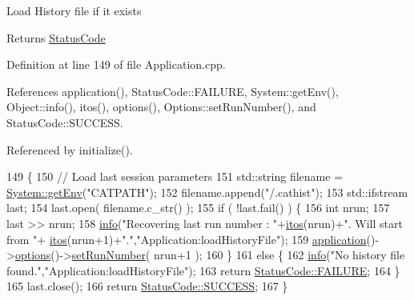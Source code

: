 Load History file if it exists \begin{DoxyReturn}{Returns}
\hyperlink{classStatusCode}{Status\+Code} 
\end{DoxyReturn}


Definition at line 149 of file Application.\+cpp.



References application(), Status\+Code\+::\+F\+A\+I\+L\+U\+RE, System\+::get\+Env(), Object\+::info(), itos(), options(), Options\+::set\+Run\+Number(), and Status\+Code\+::\+S\+U\+C\+C\+E\+SS.



Referenced by initialize().


\begin{DoxyCode}
149                                        \{
150   \textcolor{comment}{// Load last session parameters}
151   std::string filename = \hyperlink{namespaceSystem_af83af19ba6c1083e5643390dfd65f7aa}{System::getEnv}(\textcolor{stringliteral}{"CATPATH"});
152   filename.append(\textcolor{stringliteral}{"/.cathist"});
153   std::ifstream last;
154   last.open( filename.c\_str() );
155   \textcolor{keywordflow}{if} ( !last.fail() ) \{
156     \textcolor{keywordtype}{int} nrun;
157     last >> nrun;
158     \hyperlink{classObject_a644fd329ea4cb85f54fa6846484b84a8}{info}(\textcolor{stringliteral}{"Recovering last run number : "}+\hyperlink{Tools_8h_af330027dbdafb9a30768b3613c553e60}{itos}(nrun)+\textcolor{stringliteral}{". Will start from "}+
      \hyperlink{Tools_8h_af330027dbdafb9a30768b3613c553e60}{itos}(nrun+1)+\textcolor{stringliteral}{"."},\textcolor{stringliteral}{"Application:loadHistoryFile"});
159     \hyperlink{Tools_8h_a27885a3c35afe79029fb830f32f66458}{application}()->\hyperlink{classApplication_ada7cc0e8db586985f1435aee0c79f47d}{options}()->\hyperlink{classOptions_aed19a55eb2c418f333bc97615cf4a3a8}{setRunNumber}( nrun+1 );
160   \}
161   \textcolor{keywordflow}{else} \{
162     \hyperlink{classObject_a644fd329ea4cb85f54fa6846484b84a8}{info}(\textcolor{stringliteral}{"No history file found."},\textcolor{stringliteral}{"Application:loadHistoryFile"});
163     \textcolor{keywordflow}{return} \hyperlink{classStatusCode_a6f565cbeadc76d14c72f047e5e85eb4ba3da73d4c469762eb9d3c960368252b26}{StatusCode::FAILURE};
164   \}
165   last.close();
166   \textcolor{keywordflow}{return} \hyperlink{classStatusCode_a6f565cbeadc76d14c72f047e5e85eb4badd0da38d3ba0d922efd1f4619bc37ad8}{StatusCode::SUCCESS};
167 \}
\end{DoxyCode}
\mbox{\label{classApplication_ab38055646202ef49c9ee2eda6d48076f}} 

